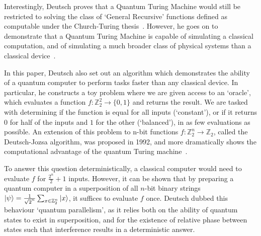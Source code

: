 \documentclass{standalone}
\begin{document}
\par
Interestingly, Deutsch proves that a Quantum Turing Machine would still be restricted to solving the class of `General Recursive' functions defined as computable under the Church-Turing thesis~\cite{Deutsch1985}. However, he goes on to demonstrate that a Quantum Turing Machine is capable of simulating a classical computation, and of simulating a much broader class of physical systems than a classical device~\cite{Deutsch1985}.
\par
In this paper, Deutsch also set out an algorithm which demonstrates the ability of a quantum computer to perform tasks faster than any classical device. In particular, he constructs a toy problem where we are given access to an `oracle', which evaluates a function $f:\mathbb{Z}_{2}^{2}\rightarrow\{0,1\}$ and returns the result. We are tasked with determining if the function is equal for all inputs (`constant'), or if it returns $0$ for half of the inputs and $1$ for the other (`balanced'), in as few evaluations as possible. An extension of this problem to n-bit functions $f:\mathbb{Z}_{2}^{n}\rightarrow\mathbb{Z}_{2}$, called the Deutsch-Jozsa algorithm, was proposed in 1992, and more dramatically shows the computational advantage of the quantum Turing machine~\cite{Deutsch92}.
\par
To answer this question deterministically, a classical computer would need to evaluate $f$ for $\frac{2^{n}}{2}+1$ inputs. However, it can be shown that by preparing a quantum computer in a superposition of all $n$-bit binary strings $\ket{\psi}=\frac{1}{\sqrt{2}^{n}}\sum_{x\in\mathbb{Z}_{2}^{n}}\ket{x}$, it suffices to evaluate $f$ once. Deutsch dubbed this behaviour `quantum parallelism', as it relies both on the ability of quantum states to exist in superposition, and for the existence of relative phase between states such that interference results in a deterministic answer.
\par
\end{document}
